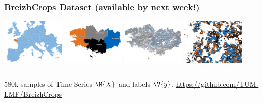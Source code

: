 \documentclass[%
  aspectratio=169,
  9pt,
  USenglish,
  titlegraphic, %
  affiliationintitlepagehead,
  affiliation,
]{beamer}
\begin{document}
\begin{frame}
\begin{columns}
	\end{columns}
	
\end{frame}

\begin{frame}
\frametitle{BreizhCrops Dataset (available by next week!)}

\includegraphics[width=3cm]{images/map/europe}
\includegraphics[width=3cm]{images/map/regions}
\includegraphics[width=3cm]{images/map/breizh}
\includegraphics[width=3cm]{images/map/parcels}

\vspace{1em}

%
\begin{columns}
	
%	
%	
	
\end{columns}

\vspace{1em}

\Large
580k samples of Time Series $\M{X}$ and labels $\V{y}$. \Large \url{https://github.com/TUM-LMF/BreizhCrops}

\end{frame}
\end{document}
